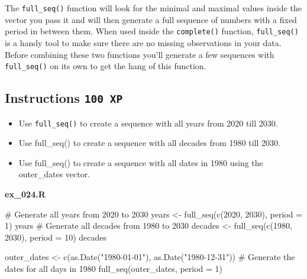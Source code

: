 \documentclass[
  letterpaper,
  DIV=11,
  numbers=noendperiod]{scrreprt}
\newenvironment{Shaded}{\begin{snugshade}}{\end{snugshade}}
\newcommand{\AttributeTok}[1]{\textcolor[rgb]{0.40,0.45,0.13}{#1}}
\newcommand{\CommentTok}[1]{\textcolor[rgb]{0.37,0.37,0.37}{#1}}
\newcommand{\DecValTok}[1]{\textcolor[rgb]{0.68,0.00,0.00}{#1}}
\newcommand{\FunctionTok}[1]{\textcolor[rgb]{0.28,0.35,0.67}{#1}}
\newcommand{\NormalTok}[1]{\textcolor[rgb]{0.00,0.23,0.31}{#1}}
\newcommand{\OtherTok}[1]{\textcolor[rgb]{0.00,0.23,0.31}{#1}}
\newcommand{\StringTok}[1]{\textcolor[rgb]{0.13,0.47,0.30}{#1}}
\providecommand{\tightlist}{%
  \setlength{\itemsep}{0pt}\setlength{\parskip}{0pt}}\usepackage{longtable,booktabs,array}
\begin{document}
The \texttt{full\_seq()} function will look for the minimal and maximal
values inside the vector you pass it and will then generate a full
sequence of numbers with a fixed period in between them. When used
inside the \texttt{complete()} function, \texttt{full\_seq()} is a handy
tool to make sure there are no missing observations in your data. Before
combining these two functions you'll generate a few sequences with
\texttt{full\_seq()} on its own to get the hang of this function.

\hypertarget{instructions-100-xp-21}{%
\subsection*{\texorpdfstring{Instructions
\texttt{100\ XP}}{Instructions 100 XP}}\label{instructions-100-xp-21}}

\begin{itemize}
\tightlist
\item
  Use \texttt{full\_seq()} to create a sequence with all years from 2020
  till 2030.
\item
  Use full\_seq() to create a sequence with all decades from 1980 till
  2030.
\item
  Use full\_seq() to create a sequence with all dates in 1980 using the
  outer\_dates vector.
\end{itemize}

\textbf{ex\_024.R}

\begin{Shaded}
\begin{Highlighting}[]
\CommentTok{\# Generate all years from 2020 to 2030}
\NormalTok{years }\OtherTok{\textless{}{-}} \FunctionTok{full\_seq}\NormalTok{(}\FunctionTok{c}\NormalTok{(}\DecValTok{2020}\NormalTok{, }\DecValTok{2030}\NormalTok{), }\AttributeTok{period =} \DecValTok{1}\NormalTok{)}
\NormalTok{years}
\CommentTok{\# Generate all decades from 1980 to 2030}
\NormalTok{decades }\OtherTok{\textless{}{-}} \FunctionTok{full\_seq}\NormalTok{(}\FunctionTok{c}\NormalTok{(}\DecValTok{1980}\NormalTok{, }\DecValTok{2030}\NormalTok{), }\AttributeTok{period =} \DecValTok{10}\NormalTok{)}
\NormalTok{decades}

\NormalTok{outer\_dates }\OtherTok{\textless{}{-}} \FunctionTok{c}\NormalTok{(}\FunctionTok{as.Date}\NormalTok{(}\StringTok{"1980{-}01{-}01"}\NormalTok{), }\FunctionTok{as.Date}\NormalTok{(}\StringTok{"1980{-}12{-}31"}\NormalTok{))}
\CommentTok{\# Generate the dates for all days in 1980}
\FunctionTok{full\_seq}\NormalTok{(outer\_dates, }\AttributeTok{period =} \DecValTok{1}\NormalTok{)}
\end{Highlighting}
\end{Shaded}
\end{document}
